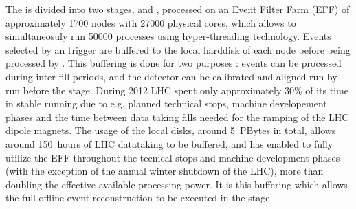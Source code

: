 
The \hlt is divided into two stages, \hltone and \hlttwo, processed on
an Event Filter Farm (EFF) of approximately 1700 nodes with 27000
physical cores,   which allows to simultaneosuly run 50000 processes
using hyper-threading technology.  Events selected by an \hltone
trigger are buffered to the local harddisk of each node before being
processed by \hlttwo.  This buffering is done for two purposes :
events can be processed during inter-fill periods, and the detector
can be calibrated and aligned run-by-run before the \hlttwo stage.
During 2012 LHC spent only approximately $30\%$ of its time in stable
running due to e.g.  planned technical stops, machine developement
phases and the time between data taking fills needed for the ramping
of the LHC dipole magnets.  The usage of the local disks, around
5~PBytes in total, allows around 150~hours of LHC datataking to be
buffered, and has enabled \lhcb to fully utilize the EFF throughout
the tecnical stops and machine development phases (with the exception
of the annual winter shutdown of the LHC), more than doubling the
effective available processing power.  It is this buffering which
allows the full offline event reconstruction to be executed in the
\hlttwo stage.

